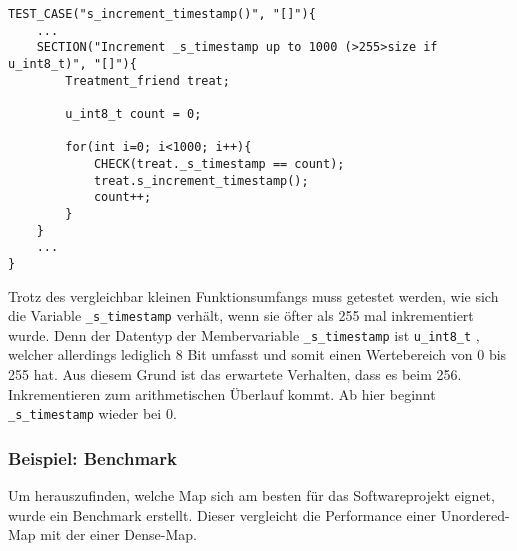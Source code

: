 \documentclass[../review_3.tex]{subfiles}
\begin{document}
\begin{lstlisting}
TEST_CASE("s_increment_timestamp()", "[]"){
    ...
    SECTION("Increment _s_timestamp up to 1000 (>255>size if u_int8_t)", "[]"){
        Treatment_friend treat;
        
        u_int8_t count = 0;
        
        for(int i=0; i<1000; i++){
            CHECK(treat._s_timestamp == count);
            treat.s_increment_timestamp();
            count++; 
        }
    }
    ...
}\end{lstlisting}
Trotz des vergleichbar kleinen Funktionsumfangs muss getestet werden, wie sich die Variable \texttt{\_s\_timestamp} verhält, wenn sie öfter als 255 mal inkrementiert wurde. Denn der Datentyp der Membervariable \texttt{\_s\_timestamp} ist \texttt{u\_int8\_t} , welcher allerdings lediglich 8 Bit umfasst und somit einen Wertebereich von 0 bis 255 hat. Aus diesem Grund ist das erwartete Verhalten, dass es beim 256. Inkrementieren zum arithmetischen Überlauf kommt. Ab hier beginnt \texttt{\_s\_timestamp} wieder bei 0. %

\subsubsection{Beispiel: Benchmark}
Um herauszufinden, welche Map sich am besten für das Softwareprojekt eignet, wurde ein Benchmark erstellt. Dieser vergleicht die Performance einer Unordered-Map mit der einer Dense-Map.
\end{document}
